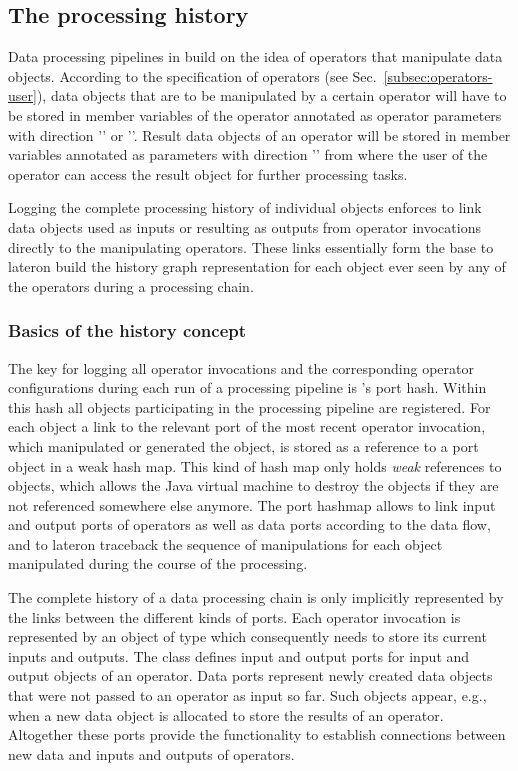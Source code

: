 \subsection{The processing history}
\label{subsec:history}

Data processing pipelines in \alida build on the idea of operators that
manipulate data objects. According to the specification of \alida operators
(see Sec.~\ref{subsec:operators-user}), data objects that are to be manipulated by a
certain operator will have to be stored in member variables of the
operator annotated as operator parameters with direction '' or ''.
Result data objects of an operator will be stored in member
variables annotated as parameters with direction '' from where the user of
the operator can access the result object for further processing tasks.

Logging the complete processing history of individual objects enforces \alida
to link data objects used as inputs or resulting as outputs from operator
invocations directly to the manipulating operators. These links essentially form the
base to lateron build the history graph representation for each object ever
seen by any of the \alida operators during a processing chain.

\subsubsection{Basics of the history concept}
\label{subsubsec:basicshistory}
The key for logging all operator invocations and the corresponding operator
configurations during each run of a processing pipeline is \alida's
port hash. Within this hash all objects participating in the
processing pipeline are registered. 
For each object a link to the relevant port of the most recent operator
invocation, which manipulated or generated the object, is stored
as a reference to a port object in a weak hash map. This kind of
hash map only holds \textit{weak} references to objects, which allows the Java virtual machine
to destroy the objects if they are not referenced somewhere else anymore. The
port hashmap allows to link input and output ports of operators as well as data
ports according to the data flow, and to lateron traceback the sequence of
manipulations for each object manipulated during the course of the processing.

The complete history of a data processing chain is only implicitly represented
by the links between the different kinds of ports. Each operator invocation is
represented by an object of type  which consequently needs to
store its current inputs and outputs. The  class defines input
and output ports for input and output objects of an operator. 
Data ports represent newly created data objects that were not passed to an
operator as input so far. Such objects appear, e.g., when a new data object is
allocated to store the results of an operator. Altogether these ports provide
the functionality to establish connections between new data and inputs and
outputs of operators. 

